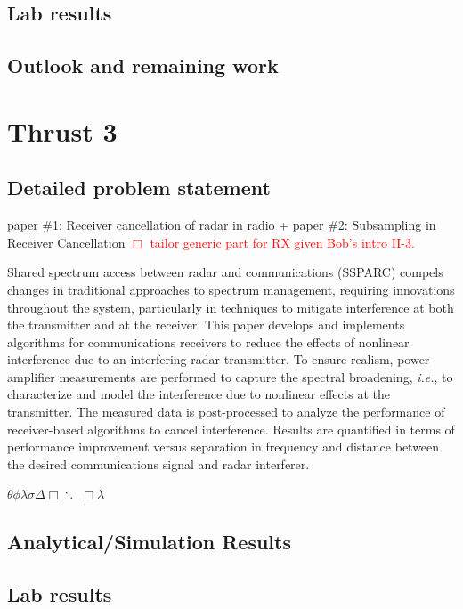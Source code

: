 \documentclass[11pt,onecolumn]{IEEEtran}
\begin{document}
\subsection{Lab results}
\subsection{Outlook and remaining work}

\section{Thrust 3}
\subsection{Detailed problem statement}  paper \#1:  Receiver cancellation of radar in radio + paper \#2:  Subsampling in Receiver Cancellation\hspace{3mm} \textcolor{red}{$\Box$ tailor generic part for RX given Bob's intro II-3.}\par
Shared spectrum access between radar and communications (SSPARC) compels changes in traditional approaches to spectrum management, requiring innovations throughout the system, particularly in techniques to mitigate interference at both the transmitter and at the receiver.  This paper develops and implements algorithms for communications receivers to reduce the effects of nonlinear interference due to an interfering radar transmitter.  To ensure realism, power amplifier measurements are performed to capture the spectral broadening, \emph{i.e.}, to characterize and model the interference due to nonlinear effects at the transmitter.  The measured data is post-processed to analyze the performance of receiver-based algorithms to cancel interference.  Results are quantified in terms of performance improvement versus separation in frequency and distance between the desired communications signal and radar interferer.\par

$\theta \phi \lambda \sigma \Delta \Box \ddots$
$\Box \lambda$

\subsection{Analytical/Simulation Results}
\subsection{Lab results}
\end{document}
